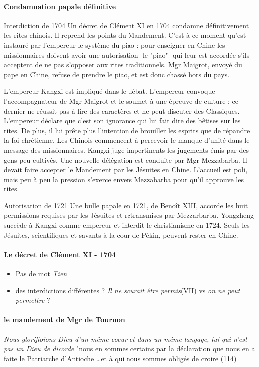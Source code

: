 \paragraph{Condamnation papale définitive}
Interdiction de 1704
Un décret de Clément XI en 1704 condamne définitivement les rites chinois. Il reprend les points du Mandement. C'est à ce moment qu'est instauré par l'empereur le système du piao : pour enseigner en Chine les missionnaires doivent avoir une autorisation -le "piao"- qui leur est accordée s’ils acceptent de ne pas s’opposer aux rites traditionnels. Mgr Maigrot, envoyé du pape en Chine, refuse de prendre le piao, et est donc chassé hors du pays.

L'empereur Kangxi est impliqué dans le débat. L'empereur convoque l'accompagnateur de Mgr Maigrot et le soumet à une épreuve de culture : ce dernier ne réussit pas à lire des caractères et ne peut discuter des Classiques. L'empereur déclare que c'est son ignorance qui lui fait dire des bêtises sur les rites. De plus, il lui prête plus l'intention de brouiller les esprits que de répandre la foi chrétienne. Les Chinois commencent à percevoir le manque d'unité dans le message des missionnaires. Kangxi juge impertinents les jugements émis par des gens peu cultivés. Une nouvelle délégation est conduite par Mgr Mezzabarba. Il devait faire accepter le Mandement par les Jésuites en Chine. L'accueil est poli, mais peu à peu la pression s'exerce envers Mezzabarba pour qu'il approuve les rites.

Autorisation de 1721
Une bulle papale en 1721, de Benoît XIII, accorde les huit permissions requises par les Jésuites et retransmises par Mezzarbarba. Yongzheng succède à Kangxi comme empereur et interdit le christianisme en 1724. Seuls les Jésuites, scientifiques et savants à la cour de Pékin, peuvent rester en Chine.


\paragraph{Le décret de Clément XI - 1704}
\begin{itemize}
    \item Pas de mot \textit{Tien }
    \item des interdictions différentes ? \textit{Il ne saurait être permis}(VII) vs  \textit{on ne peut permettre} ?
\end{itemize}

\paragraph{le mandement de Mgr de Tournon}
\textit{Nous glorifioions Dieu d'un même coeur et dans un même langage, lui qui n'est pas un Dieu de dicorde}
"nous en sommes certains par la déclaration que nous en a faite le Patriarche d'Antioche \ldots et à qui nous sommes obligés de croire (114)


